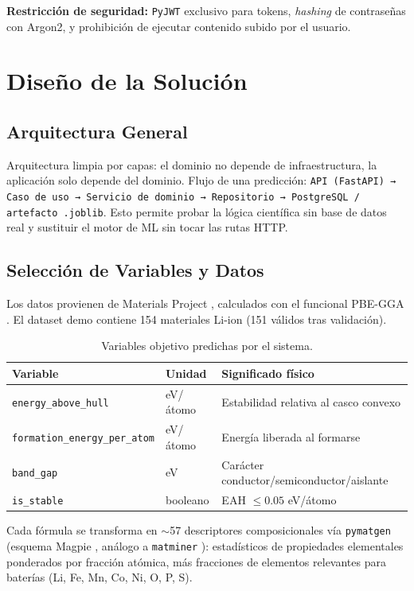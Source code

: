 \textbf{Restricción de seguridad:} \texttt{PyJWT} exclusivo para tokens, \textit{hashing} de contraseñas con
Argon2, y prohibición de ejecutar contenido subido por el usuario.

\section{Diseño de la Solución}

\subsection{Arquitectura General}

Arquitectura limpia por capas: el dominio no depende de infraestructura, la
aplicación solo depende del dominio. Flujo de una predicción:
\texttt{API (FastAPI) → Caso de uso → Servicio de dominio → Repositorio →
PostgreSQL / artefacto \texttt{.joblib}}. Esto permite probar la lógica
científica sin base de datos real y sustituir el motor de ML sin tocar las
rutas HTTP.

\subsection{Selección de Variables y Datos}

Los datos provienen de Materials Project \citep{jain2013materialsproject},
calculados con el funcional PBE-GGA \citep{perdew1996generalized}. El
dataset demo contiene 154 materiales Li-ion (151 válidos tras validación).

\begin{table}[H]
\centering
\small
\caption{Variables objetivo predichas por el sistema.}
\label{tab:variables}
\begin{tabularx}{\textwidth}{l l X}
\toprule
\textbf{Variable} & \textbf{Unidad} & \textbf{Significado físico} \\
\midrule
\texttt{energy\_above\_hull} & eV/átomo & Estabilidad relativa al casco convexo \\
\texttt{formation\_energy\_per\_atom} & eV/átomo & Energía liberada al formarse \\
\texttt{band\_gap} & eV & Carácter conductor/semiconductor/aislante \\
\texttt{is\_stable} & booleano & EAH $\leq 0.05$ eV/átomo \\
\bottomrule
\end{tabularx}
\end{table}

Cada fórmula se transforma en $\sim$57 descriptores composicionales vía
\texttt{pymatgen} (esquema Magpie \citep{ward2016general}, análogo a
\texttt{matminer} \citep{ward2018matminer}): estadísticos de propiedades
elementales ponderados por fracción atómica, más fracciones de elementos
relevantes para baterías (Li, Fe, Mn, Co, Ni, O, P, S).

